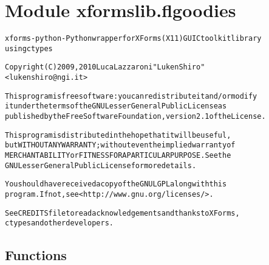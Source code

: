%
%
%


\section{Module xformslib.flgoodies}

    \label{xformslib:flgoodies}
\begin{alltt}

xforms-python - Python wrapper for XForms (X11) GUI C toolkit library
using ctypes

Copyright (C) 2009, 2010  Luca Lazzaroni "LukenShiro"
    {\textless}lukenshiro@ngi.it{\textgreater}

This program is free software: you can redistribute it and/or modify
it under the terms of the GNU Lesser General Public License as
published by the Free Software Foundation, version 2.1 of the License.

This program is distributed in the hope that it will be useful,
but WITHOUT ANY WARRANTY; without even the implied warranty of
MERCHANTABILITY or FITNESS FOR A PARTICULAR PURPOSE. See the
GNU Lesser General Public License for more details.

You should have received a copy of the GNU LGPL along with this
program. If not, see {\textless}http://www.gnu.org/licenses/{\textgreater}.

See CREDITS file to read acknowledgements and thanks to XForms,
ctypes and other developers.
\end{alltt}



  \subsection{Functions}

    \label{xformslib:flgoodies:fl_set_goodies_font}


